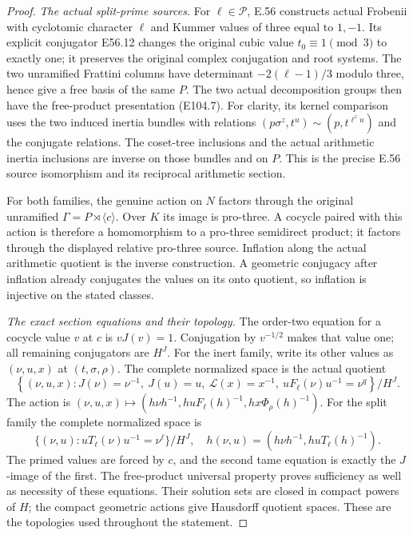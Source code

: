 \begin{proof}
\emph{The actual split-prime sources.}
For $\ell\in\mathscr P$, E.56 constructs actual
Frobenii with cyclotomic character $\ell$ and Kummer
values of three equal to $1,-1$. Its explicit
conjugator E56.12 changes the original cubic value
$t_0\equiv1\pmod3$ to exactly one; it preserves
the original complex conjugation and root systems.
The two unramified Frattini columns have determinant
$-2(\ell-1)/3$ modulo three, hence give a free basis
of the same $P$. The two actual decomposition groups
then have the free-product presentation (E104.7).
For clarity, its kernel comparison uses the two
induced inertia bundles with relations
$(p\sigma^z,t^u)\sim(p,t^{\ell^zu})$ and the conjugate
relations. The coset-tree inclusions and the actual
arithmetic inertia inclusions are inverse on those
bundles and on $P$. This is the precise E.56
source isomorphism and its reciprocal arithmetic section.

For both families, the genuine action on $N$ factors
through the original unramified $\Gamma=P\rtimes\langle c\rangle$.
Over $K$ its image is pro-three. A cocycle paired
with this action is therefore a homomorphism to a
pro-three semidirect product; it factors through
the displayed relative pro-three source. Inflation
along the actual arithmetic quotient is the inverse
construction. A geometric conjugacy after inflation
already conjugates the values on its onto quotient,
so inflation is injective on the stated classes.

\emph{The exact section equations and their topology.}
The order-two equation for a cocycle value $v$ at
$c$ is $vJ(v)=1$. Conjugation by $v^{-1/2}$ makes
that value one; all remaining conjugators are $H^J$.
For the inert family, write its other values as
$(\nu,u,x)$ at $(t,\sigma,\rho)$. The complete
normalized space is the actual quotient
\[
 \left\{(\nu,u,x):
 J(\nu)=\nu^{-1},\ J(u)=u,\
 \mathcal L(x)=x^{-1},\ uF_\ell(\nu)u^{-1}=\nu^q
 \right\}/H^J .
 \tag{E104.15}
\]
The action is
$(\nu,u,x)\mapsto
(h\nu h^{-1},huF_\ell(h)^{-1},hx\Phi_\rho(h)^{-1})$.
For the split family the complete normalized space is
\[
 \{(\nu,u):uT_\ell(\nu)u^{-1}=\nu^\ell\}/H^J,
 \quad h(\nu,u)=(h\nu h^{-1},huT_\ell(h)^{-1}).
 \tag{E104.16}
\]
The primed values are forced by $c$, and the second
tame equation is exactly the $J$-image of the first.
The free-product universal property proves sufficiency
as well as necessity of these equations. Their solution
sets are closed in compact powers of $H$; the compact
geometric actions give Hausdorff quotient spaces.
These are the topologies used throughout the statement.


\end{proof}

